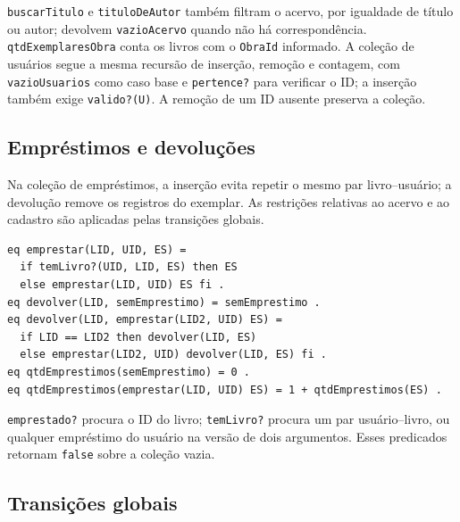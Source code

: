 \documentclass[a4paper,12pt]{article}
\begin{document}
\texttt{buscarTitulo} e \texttt{tituloDeAutor} também filtram o acervo, por
igualdade de título ou autor; devolvem \texttt{vazioAcervo} quando não há
correspondência. \texttt{qtdExemplaresObra} conta os livros com o
\texttt{ObraId} informado. A coleção de usuários segue a mesma recursão de
inserção, remoção e contagem, com \texttt{vazioUsuarios} como caso base e
\texttt{pertence?} para verificar o ID; a inserção também exige
\texttt{valido?(\allowbreak{}U)}. A remoção de um ID ausente preserva a coleção.

\subsection{Empréstimos e devoluções}

Na coleção de empréstimos, a inserção evita repetir o mesmo par livro--usuário;
a devolução remove os registros do exemplar. As restrições relativas ao acervo
e ao cadastro são aplicadas pelas transições globais.
\begin{lstlisting}
eq emprestar(LID, UID, ES) =
  if temLivro?(UID, LID, ES) then ES
  else emprestar(LID, UID) ES fi .
eq devolver(LID, semEmprestimo) = semEmprestimo .
eq devolver(LID, emprestar(LID2, UID) ES) =
  if LID == LID2 then devolver(LID, ES)
  else emprestar(LID2, UID) devolver(LID, ES) fi .
eq qtdEmprestimos(semEmprestimo) = 0 .
eq qtdEmprestimos(emprestar(LID, UID) ES) = 1 + qtdEmprestimos(ES) .
\end{lstlisting}

\texttt{emprestado?} procura o ID do livro; \texttt{temLivro?} procura um par
usuário--livro, ou qualquer empréstimo do usuário na versão de dois argumentos.
Esses predicados retornam \texttt{false} sobre a coleção vazia.

\subsection{Transições globais}
\end{document}
